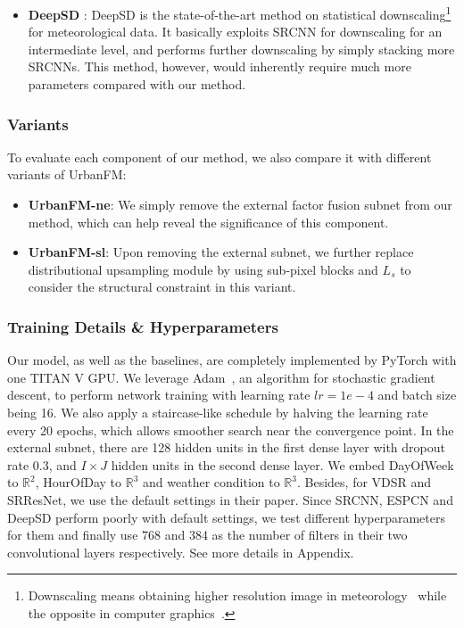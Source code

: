\begin{itemize}[leftmargin=*]
\item \textbf{DeepSD} \cite{vandal2017deepsd}: DeepSD is the state-of-the-art method on statistical downscaling\footnote{Downscaling means obtaining higher resolution image in meteorology~\cite{vandal2017deepsd} while the opposite in computer graphics~\cite{dong2016srcnn}.} for meteorological data. It basically exploits SRCNN for downscaling for an intermediate level, and performs further downscaling by simply stacking more SRCNNs. This method, however, would inherently require much more parameters compared with our method.
\end{itemize}

\subsubsection{Variants}
To evaluate each component of our method, we also compare it with different variants of UrbanFM:
\begin{itemize}[leftmargin=*]
	\item \textbf{UrbanFM-ne}: We simply remove the external factor fusion subnet from our method, which can help reveal the significance of this component.
	\item \textbf{UrbanFM-sl}: Upon removing the external subnet, we further replace distributional upsampling module by using sub-pixel blocks and $L_s$ to consider the structural constraint in this variant. 
	\end{itemize}

\subsubsection{Training Details \& Hyperparameters}

Our model, as well as the baselines, are completely implemented by PyTorch  with one TITAN V GPU. We leverage Adam~\cite{kingma2014adam}, an algorithm for stochastic gradient descent, to perform network training with learning rate $lr=1e-4$ and batch size being 16. We also apply a staircase-like schedule by halving the learning rate every 20 epochs, which allows smoother search near the convergence point. In the external subnet, there are 128 hidden units in the first dense layer with dropout rate 0.3, and $I \times J$ hidden units in the second dense layer. We embed DayOfWeek to $\mathbb{R}^2$, HourOfDay to $\mathbb{R}^3$ and weather condition to $\mathbb{R}^3$. Besides, for VDSR and SRResNet, we use the default settings in their paper. Since SRCNN, ESPCN and DeepSD perform poorly with default settings, we test different hyperparameters for them and finally use 768 and 384 as the number of filters in their two convolutional layers respectively. See more details in Appendix.

